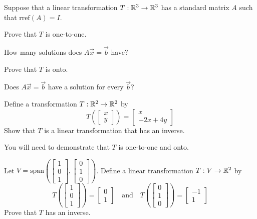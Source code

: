 \documentclass{ximera}
\begin{document}
 \begin{problem}\label{prob:inverses3}
 Suppose that a linear transformation $T:\mathbb{R}^3\rightarrow \mathbb{R}^3$ has a standard matrix $A$ such that $\text{rref}(A)=I$.
 
 Prove that $T$ is one-to-one.
 \begin{hint}
 How many solutions does $A\vec{x}=\vec{b}$ have?
 \end{hint}
 Prove that $T$ is onto.
 \begin{hint}
 Does $A\vec{x}=\vec{b}$ have a solution for every $\vec{b}$?
 \end{hint}
 \end{problem}
 
 \begin{problem}\label{prob:inverses4}
 Define a transformation $T:\mathbb{R}^2\rightarrow \mathbb{R}^2$ by 
 $$T\left(\begin{bmatrix}x\\y\end{bmatrix}\right)=\begin{bmatrix}x\\-2x+4y\end{bmatrix}$$
 Show that $T$ is a linear transformation that has an inverse.
 \begin{hint}
You will need to demonstrate that $T$ is one-to-one and onto.
 \end{hint}
 \end{problem}
 
 \begin{problem}\label{prob:inverses5}
 Let $V=\text{span}\left(\begin{bmatrix}1\\0\\1\end{bmatrix}, \begin{bmatrix}0\\1\\0\end{bmatrix}\right)$.  Define a linear transformation $T:V\rightarrow \mathbb{R}^2$ by
 $$T\left(\begin{bmatrix}1\\0\\1\end{bmatrix}\right)=\begin{bmatrix}0\\1\end{bmatrix}\quad \text{and}\quad T\left(\begin{bmatrix}0\\1\\0\end{bmatrix}\right)=\begin{bmatrix}-1\\1\end{bmatrix}$$
 Prove that $T$ has an inverse.
 \end{problem}
\end{document}

